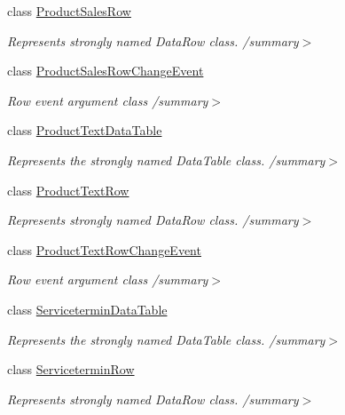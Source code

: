 \begin{DoxyCompactItemize}
class \hyperlink{class_products_1_1_data_1_1ds_sage_1_1_product_sales_row}{Product\+Sales\+Row}
\begin{DoxyCompactList}\small\item\em Represents strongly named Data\+Row class. /summary$>$ \end{DoxyCompactList}\item 
class \hyperlink{class_products_1_1_data_1_1ds_sage_1_1_product_sales_row_change_event}{Product\+Sales\+Row\+Change\+Event}
\begin{DoxyCompactList}\small\item\em Row event argument class /summary$>$ \end{DoxyCompactList}\item 
class \hyperlink{class_products_1_1_data_1_1ds_sage_1_1_product_text_data_table}{Product\+Text\+Data\+Table}
\begin{DoxyCompactList}\small\item\em Represents the strongly named Data\+Table class. /summary$>$ \end{DoxyCompactList}\item 
class \hyperlink{class_products_1_1_data_1_1ds_sage_1_1_product_text_row}{Product\+Text\+Row}
\begin{DoxyCompactList}\small\item\em Represents strongly named Data\+Row class. /summary$>$ \end{DoxyCompactList}\item 
class \hyperlink{class_products_1_1_data_1_1ds_sage_1_1_product_text_row_change_event}{Product\+Text\+Row\+Change\+Event}
\begin{DoxyCompactList}\small\item\em Row event argument class /summary$>$ \end{DoxyCompactList}\item 
class \hyperlink{class_products_1_1_data_1_1ds_sage_1_1_servicetermin_data_table}{Servicetermin\+Data\+Table}
\begin{DoxyCompactList}\small\item\em Represents the strongly named Data\+Table class. /summary$>$ \end{DoxyCompactList}\item 
class \hyperlink{class_products_1_1_data_1_1ds_sage_1_1_servicetermin_row}{Servicetermin\+Row}
\begin{DoxyCompactList}\small\item\em Represents strongly named Data\+Row class. /summary$>$ \end{DoxyCompactList}\item 

\end{DoxyCompactItemize}
